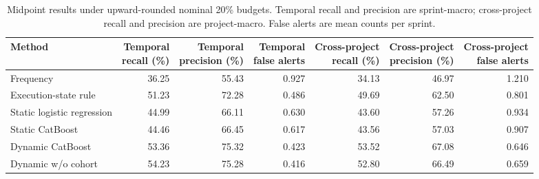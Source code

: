 \begin{table}[htbp]
\centering\footnotesize\setlength{\tabcolsep}{4pt}
\caption{Midpoint results under upward-rounded nominal 20\% budgets. Temporal recall and precision are sprint-macro; cross-project recall and precision are project-macro. False alerts are mean counts per sprint.}\label{tab:02_performance}
\begin{tabular}{@{}lrrrrrr@{}}
\toprule
Method & \shortstack{Temporal\\recall (\%)} & \shortstack{Temporal\\precision (\%)} & \shortstack{Temporal\\false alerts} & \shortstack{Cross-project\\recall (\%)} & \shortstack{Cross-project\\precision (\%)} & \shortstack{Cross-project\\false alerts} \\
\midrule
Frequency & 36.25 & 55.43 & 0.927 & 34.13 & 46.97 & 1.210 \\
Execution-state rule & 51.23 & 72.28 & 0.486 & 49.69 & 62.50 & 0.801 \\
Static logistic regression & 44.99 & 66.11 & 0.630 & 43.60 & 57.26 & 0.934 \\
Static CatBoost & 44.46 & 66.45 & 0.617 & 43.56 & 57.03 & 0.907 \\
Dynamic CatBoost & 53.36 & 75.32 & 0.423 & 53.52 & 67.08 & 0.646 \\
Dynamic w/o cohort & 54.23 & 75.28 & 0.416 & 52.80 & 66.49 & 0.659 \\
\bottomrule
\end{tabular}
\end{table}
